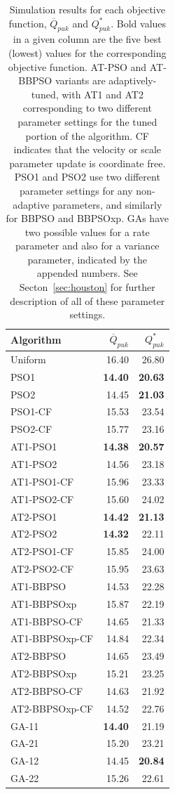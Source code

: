 \documentclass[cmbright]{staauth}
\begin{document}
\begin{table}[p]
\centering
\begingroup\scriptsize
\begin{tabular}{lrr}
Algorithm & $\overline{Q}_{puk}$ & $Q^*_{puk}$ \\\hline
Uniform & 16.40 & 26.80 \\\hline
PSO1 & \bf{14.40} & \bf{20.63} \\
  PSO2 & 14.45 & \bf{21.03}\\
  PSO1-CF & 15.53 & 23.54 \\
  PSO2-CF & 15.77 & 23.16 \\
   \hline
AT1-PSO1 & \bf{14.38} & \bf{20.57} \\
  AT1-PSO2 & 14.56 & 23.18 \\
  AT1-PSO1-CF & 15.96 & 23.33 \\
  AT1-PSO2-CF & 15.60 & 24.02 \\
   \hline
AT2-PSO1 & \bf{14.42} & \bf{21.13} \\
  AT2-PSO2 & \bf{14.32} & 22.11 \\
  AT2-PSO1-CF & 15.85 & 24.00 \\
  AT2-PSO2-CF & 15.95 & 23.63 \\
   \hline
AT1-BBPSO & 14.53 & 22.28 \\
  AT1-BBPSOxp & 15.87 & 22.19 \\
  AT1-BBPSO-CF & 14.65 & 21.33 \\
  AT1-BBPSOxp-CF & 14.84 & 22.34 \\
   \hline
AT2-BBPSO & 14.65 & 23.49 \\
  AT2-BBPSOxp & 15.21 & 23.25 \\
  AT2-BBPSO-CF & 14.63 & 21.92\\
  AT2-BBPSOxp-CF & 14.52 & 22.76 \\
   \hline
GA-11 & \bf{14.40} & 21.19 \\
  GA-21 & 15.20 & 23.21 \\
  GA-12 & 14.45 & \bf{20.84} \\
  GA-22 & 15.26 & 22.61 \\
\hline
\end{tabular}
\endgroup
\caption{ Simulation results for each objective function, $\overline{Q}_{puk}$ and $Q^*_{puk}$. Bold values in a given column are the five best (lowest)  values for the corresponding objective function. AT-PSO and AT-BBPSO variants are adaptively-tuned, with AT1 and AT2 corresponding to two different parameter settings for the tuned portion of the algorithm. CF indicates that the velocity or scale parameter update is coordinate free. PSO1 and PSO2 use two different parameter settings for any non-adaptive parameters, and similarly for BBPSO and BBPSOxp. GAs have two possible values for a rate parameter and also for a variance parameter, indicated by the appended numbers. See Secton~\ref{sec:houston} for further description of all of these parameter settings.}
\label{tab:psokriging}
\end{table}
\end{document}
